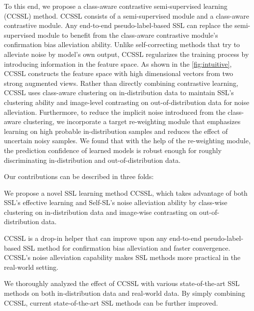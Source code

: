 \documentclass[10pt,twocolumn,letterpaper]{article}
\newcommand{\squishlist}{
 \begin{list}{}
  { \setlength{\itemsep}{0pt}
     \setlength{\parsep}{1pt}
     \setlength{\topsep}{1pt}
     \setlength{\partopsep}{0pt}
     \setlength{\leftmargin}{1.5em}
     \setlength{\labelwidth}{1em}
     \setlength{\labelsep}{0.5em} } }
\newcommand{\squishend}{
  \end{list}  }
\begin{document}
To this end, we propose a class-aware contrastive semi-supervised learning (CCSSL) method. CCSSL consists of a semi-supervised module and a class-aware contrastive module. Any end-to-end pseudo-label-based SSL can replace the semi-supervised module to benefit from the class-aware contrastive module's confirmation bias alleviation ability. Unlike self-correcting methods that try to alleviate noise by model's own output, CCSSL regularizes the training process by introducing information in the feature space. As shown in the \cref{fig:intuitive}, CCSSL constructs the feature space with high dimensional vectors from two strong augmented views. Rather than directly combining contrastive learning, CCSSL uses class-aware clustering on in-distribution data to maintain SSL's clustering ability and image-level contrasting on out-of-distribution data for noise alleviation. Furthermore, to reduce the implicit noise introduced from the class-aware clustering, we incorporate a target re-weighting module that emphasizes learning on high probable in-distribution samples and reduces the effect of uncertain noisy samples. We found that with the help of the re-weighting module, the prediction confidence of learned models is robust enough for roughly discriminating in-distribution and out-of-distribution data. 

Our contributions can be described in three folds:
\squishlist
\item We propose a novel SSL learning method CCSSL, which takes advantage of both SSL's effective learning and Self-SL's noise alleviation ability by class-wise clustering on in-distribution data and image-wise contrasting on out-of-distribution data.  

\item CCSSL is a drop-in helper that can improve upon any end-to-end pseudo-label-based SSL method for confirmation bias alleviation and faster convergence. CCSSL's noise alleviation capability makes SSL methods more practical in the real-world setting.  

\item We thoroughly analyzed the effect of CCSSL with various state-of-the-art SSL methods on both in-distribution data and real-world data. By simply combining CCSSL, current state-of-the-art SSL methods can be further improved.
\squishend
\end{document}
